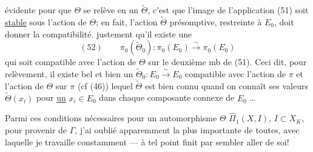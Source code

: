 évidente pour que $\Theta$ se relève en un $\widetilde{\Theta}$, c'est que l'image de l'application (51) soit \uline{stable} sous l'action de $\Theta$; en fait, l'action $\widetilde{\Theta}$ présomptive, restreinte à $E_0$, doit donner la compatibilité.      justement qu'il existe une \deleted{$\unsure{\widetilde{\Theta}}$} 
\[
(52)\qquad \pi_0(\widetilde{\Theta}_0):\pi_0(E_0)\overset{\sim}{\longrightarrow}\pi_0(E_0)
\]
 qui soit compatible avec l'action de $\Theta$ sur le deuxième mb de (51). Ceci dit, pour  relèvement, il existe bel  et bien un $\widetilde{\Theta}_0:E_0\overset{\sim}{\to}E_0$  compatible avec l'action de $\pi$ et l'action de $\Theta$ sur $\pi$ (cf (46)) lequel $\widetilde{\Theta}$ est bien connu quand on connaît ses valeurs $\widetilde{\Theta}(x_i)$  pour \uline{un} $x_i\in E_0$ dans chaque composante connexe de $E_0$ \ldots

Parmi ces conditions nécessaires  pour un automorphisme $\Theta$  $\widehat{\Pi}_1(X,I)$, $I\subset X_K$, pour provenir de $\Gamma$, j'ai oublié apparemment la plus importante de toutes, avec laquelle je travaille  constamment --- à tel point  finit par sembler aller de soi!

